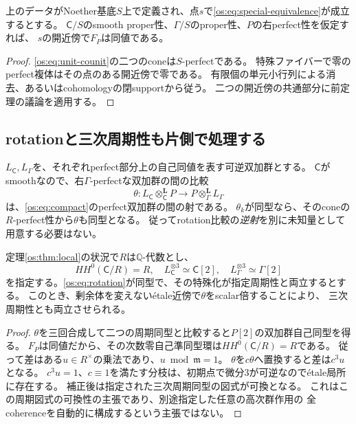 \begin{corollary}[開近傍と有限な二つのcone]\label{os:cor:open}
上のデータがNoether基底$S$上で定義され、点$s$で\eqref{os:eq:special-equivalence}が成立するとする。
$\mathsf C/S$のsmooth proper性、$\Gamma/S$のproper性、$P$の右perfect性を仮定すれば、
$s$の開近傍で$F_P$は同値である。
\end{corollary}
\begin{proof}
\eqref{os:eq:unit-counit}の二つのconeは$S$-perfectである。
特殊ファイバーで零のperfect複体はその点のある開近傍で零である。
有限個の単元小行列による消去、あるいはcohomologyの閉supportから従う。
二つの開近傍の共通部分に前定理の議論を適用する。
\end{proof}

\subsection{rotationと三次周期性も片側で処理する}

$L_{\mathsf C},L_\Gamma$を、それぞれperfect部分上の自己同値を表す可逆双加群とする。
$\mathsf C$がsmoothなので、右$\Gamma$-perfectな双加群の間の比較
\[
 \theta:L_{\mathsf C}\otimes_{\mathsf C}^{\mathbf L}P
       \longrightarrow P\otimes_\Gamma^{\mathbf L}L_\Gamma
 \tag{OS5}\label{os:eq:rotation}
\]
は、\eqref{os:eq:compact}のperfect双加群の間の射である。
$\theta_k$が同型なら、そのconeの$R$-perfect性から$\theta$も同型となる。
従ってrotation比較の\emph{逆射}を別に未知量として用意する必要はない。

\begin{proposition}[周期比較のscalar補正]\label{os:prop:period}
定理\ref{os:thm:local}の状況で$R$は$\mathbb Q$-代数とし、
\[
 HH^0(\mathsf C/R)=R,
 \quad L_{\mathsf C}^{\otimes3}\simeq\mathsf C[2],
 \quad L_\Gamma^{\otimes3}\simeq\Gamma[2]
\]
を指定する。\eqref{os:eq:rotation}が同型で、その特殊化が指定周期性と両立するとする。
このとき、剰余体を変えない\'etale近傍で$\theta$をscalar倍することにより、
三次周期性とも両立させられる。
\end{proposition}
\begin{proof}
$\theta$を三回合成して二つの周期同型と比較すると$P[2]$の双加群自己同型を得る。
$F_P$は同値だから、その次数零自己準同型環は$HH^0(\mathsf C/R)=R$である。
従って差はある$u\in R^\times$の乗法であり、$u\bmod\mathfrak m=1$。
$\theta$を$c\theta$へ置換すると差は$c^3u$となる。
$c^3u=1$、$c\equiv1$を満たす分枝は、初期点で微分$3$が可逆なので\'etale局所に存在する。
補正後は指定された三次周期同型の図式が可換となる。
これはこの周期図式の可換性の主張であり、別途指定した任意の高次群作用の
全coherenceを自動的に構成するという主張ではない。
\end{proof}

